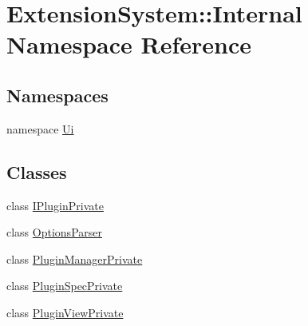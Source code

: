 \hypertarget{namespace_extension_system_1_1_internal}{\section{\-Extension\-System\-:\-:\-Internal \-Namespace \-Reference}
\label{namespace_extension_system_1_1_internal}
}
\subsection*{\-Namespaces}
\begin{DoxyCompactItemize}
\item 
namespace \hyperlink{namespace_extension_system_1_1_internal_1_1_ui}{\-Ui}
\end{DoxyCompactItemize}
\subsection*{\-Classes}
\begin{DoxyCompactItemize}
\item 
class \hyperlink{class_extension_system_1_1_internal_1_1_i_plugin_private}{\-I\-Plugin\-Private}
\item 
class \hyperlink{class_extension_system_1_1_internal_1_1_options_parser}{\-Options\-Parser}
\item 
class \hyperlink{class_extension_system_1_1_internal_1_1_plugin_manager_private}{\-Plugin\-Manager\-Private}
\item 
class \hyperlink{class_extension_system_1_1_internal_1_1_plugin_spec_private}{\-Plugin\-Spec\-Private}
\item 
class \hyperlink{class_extension_system_1_1_internal_1_1_plugin_view_private}{\-Plugin\-View\-Private}
\end{DoxyCompactItemize}
